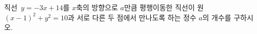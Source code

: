 직선~$y=-3x+14$를 $x$축의 방향으로 $a$만큼 평행이동한 직선이 원~$(x-1)^2+y^2=10$과 서로 다른 두 점에서 만나도록 하는 정수 $a$의 개수를 구하시오.
